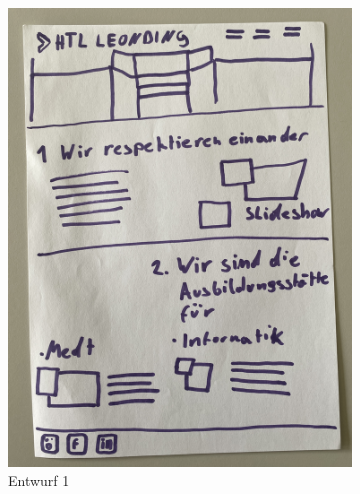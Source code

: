 \begin{figure}
   \centering
   \begin{subfigure}{0.3\textwidth}
     \includegraphics[width=\textwidth, angle=270]{pics/Entwurf_Beispiel_1.JPG}
     \caption{Entwurf 1}
     \label{fig:a}
   \end{subfigure}
   \hfill
   \begin{subfigure}{0.3\textwidth}

\end{subfigure}
\end{figure}
